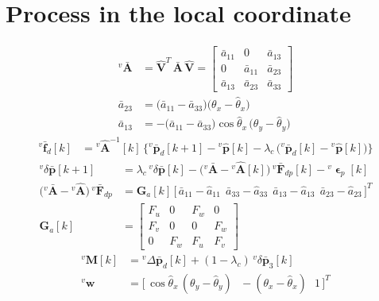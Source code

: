 \documentclass[11pt,a4paper]{ctexart}
\newcommand{\lc}{\lambda_c}
\newcommand{\dl}{\delta}
\newcommand{\Ab}{\bar{\mathbf A}}
\newcommand{\Vh}{\hat{\mathbf V}}
\newcommand{\ww}{\mathbf w}
\newcommand{\apar}{\bar a_{11}}
\newcommand{\aper}{\bar a_{33}}
\newcommand{\T}{T}
\newcommand{\vA}{{}^{v}\bar{\mathbf A}}
\newcommand{\vAh}{{}^{v}\hat{\mathbf A}}
\newcommand{\vdp}{{}^{v}\dl\bar{\mathbf p}}
\newcommand{\vF}{{}^{v}\bar{\mathbf F}_{dp}}
\newcommand{\vM}{{}^{v}\mathbf M}
\newcommand{\vep}{{}^{v}\bm{\upvarepsilon}_p}
\newcommand{\dd}{\big(\apar - \aper\big)}
\begin{document}
\section{Process in the local coordinate}
\vspace{1.2em}
\begin{align*}
\vA &= \Vh^{\T}\,\Ab\,\Vh = \begin{bmatrix} \apar & 0 & \bar a_{13} \\ 0 & \apar & \bar a_{23} \\ \bar a_{13} & \bar a_{23} & \aper \end{bmatrix} \\
\bar a_{23} &= \dd\big(\theta_x - \hat\theta_x\big) \\
\bar a_{13} &= -\dd\cos\hat\theta_x\,\big(\theta_y - \hat\theta_y\big)
\end{align*}
\vspace{1.2em}
\begin{align*}
{}^{v}\bar{\mathbf f}_d[k] &= \vAh^{-1}[k]\,\Big\{{}^{v}\bar{\mathbf p}_d[k+1] - {}^{v}\hat{\mathbf p}[k] - \lc\,\big({}^{v}\bar{\mathbf p}_d[k] - {}^{v}\hat{\mathbf p}[k]\big)\Big\}
\end{align*}
\vspace{1.2em}
\begin{align*}
\vdp[k+1] &= \lc\,\vdp[k] - \big(\vA - \vAh[k]\big)\,\vF[k] - \vep[k] \\
\big(\vA - \vAh\big)\,\vF &= \mathbf G_a[k]\,\big[\,\apar - \hat a_{11}\ \ \aper - \hat a_{33}\ \ \bar a_{13} - \hat a_{13}\ \ \bar a_{23} - \hat a_{23}\,\big]^{\T} \\
\mathbf G_a[k] &= \begin{bmatrix} F_u & 0 & F_w & 0 \\ F_v & 0 & 0 & F_w \\ 0 & F_w & F_u & F_v \end{bmatrix}
\end{align*}
\vspace{1.2em}
\begin{align*}
\vM[k] &= {}^{v}\Delta\bar{\mathbf p}_d[k] + (1-\lc)\,\vdp_3[k] \\
{}^{v}\ww &= \big[\,\cos\hat\theta_x\,(\theta_y - \hat\theta_y)\ \ \ -(\theta_x - \hat\theta_x)\ \ \ 1\,\big]^{\T}
\end{align*}
\vspace{1.2em}
\end{document}
